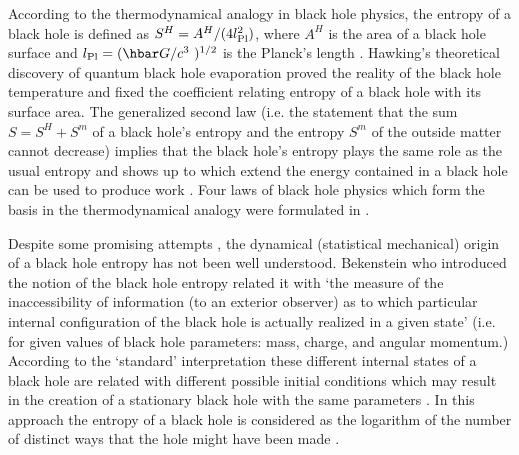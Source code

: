 \documentclass[superscriptaddress,showpacs,preprintnumbers,amsmath,amssymb,
nofootinbib,twocolumn,aps,prd,10pt]{revtex4-1}
\begin{document}
\maketitle
\newpage

According to the  thermodynamical analogy in  black hole physics,  the
entropy of a black hole  is defined as
$S^H =A^H  /(4l_{\mbox{\scriptsize{Pl}}}^2)$,
where   $A^H$   is   the   area   of   a   black   hole   surface  and
$l_{\mbox{\scriptsize{Pl}}}=(\hbar G/c^3~)^{1/2}$ is the Planck's length
\cite{Beke:72,Beke:73}. Hawking's theoretical discovery \cite{Hawk:75}
of quantum black hole  evaporation proved the  reality of the  black hole
temperature and   fixed the  coefficient relating  entropy of  a black
hole with  its surface  area.   The generalized  second law  (i.e. the
statement that the sum $S=S^H +S^m$ of a black hole's entropy and  the
entropy $S^m$ of the outside matter cannot decrease) implies that  the
black hole's  entropy plays  the same  role as  the usual  entropy and
shows up to which extend the  energy contained in a black hole  can be
used to produce work  \cite{Beke:72,Beke:73,Beke:74}. Four laws of black
hole physics which form the basis in the thermodynamical analogy  were
formulated in \cite{BaCaHa:73}.


Despite some promising attempts
\cite{Beke:73,Beke:80,York:83,ZuTh:85,ThPrMa:86}, the dynamical
(statistical mechanical) origin of a black hole entropy has not been
well understood.  Bekenstein \cite{Beke:73} who introduced the notion of
the  black  hole  entropy  related   it  with  `the  measure  of   the
inaccessibility of information (to  an exterior observer) as  to which
particular  internal  configuration  of  the  black  hole  is actually
realized in  a given  state' (i.e.   for given  values of  black  hole
parameters: mass,  charge, and  angular momentum.)   According to  the
`standard' interpretation  these different  internal states  of a
black hole are related with different possible initial conditions
which  may result  in  the  creation  of  a  stationary  black hole
with the same parameters \cite{Beke:73}.  In this  approach the
entropy    of a black   hole   is  considered     as  the  logarithm
of the number of distinct   ways    that    the   hole    might
have   been     made \cite{ZuTh:85,ThPrMa:86}.
\end{document}
